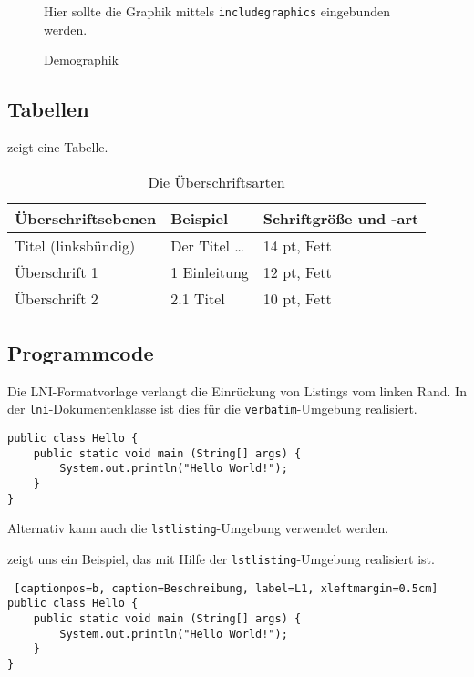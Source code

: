 \documentclass{lni}
\begin{document}
\begin{figure}
  \centering
  Hier sollte die Graphik mittels \texttt{includegraphics} eingebunden werden.

  \caption{Demographik}
  \label{fig:demo}
\end{figure}

\subsection{Tabellen}
 zeigt eine Tabelle.

\begin{table}
\centering
\begin{tabular}{lll}
\toprule
Überschriftsebenen & Beispiel & Schriftgröße und -art \\
\midrule
Titel (linksbündig) & Der Titel \ldots & 14 pt, Fett\\
Überschrift 1 & 1 Einleitung & 12 pt, Fett\\
Überschrift 2 & 2.1 Titel & 10 pt, Fett\\
\bottomrule
\end{tabular}
\caption{Die Überschriftsarten}
\label{tab:demo}
\end{table}

\subsection{Programmcode}
Die LNI-Formatvorlage verlangt die Einrückung von Listings vom linken Rand.
In der \texttt{lni}-Dokumentenklasse ist dies für die \texttt{verbatim}-Umgebung realisiert.

\begin{verbatim}
public class Hello { 
    public static void main (String[] args) { 
        System.out.println("Hello World!"); 
    } 
} 
\end{verbatim}

Alternativ kann auch die \texttt{lstlisting}-Umgebung verwendet werden.

 zeigt uns ein Beispiel, das mit Hilfe der \texttt{lstlisting}-Umgebung realisiert ist.

\lstset{basicstyle=\ttfamily}
\begin{lstlisting} [captionpos=b, caption=Beschreibung, label=L1, xleftmargin=0.5cm]
public class Hello { 
    public static void main (String[] args) { 
        System.out.println("Hello World!"); 
    } 
}
\end{lstlisting}
\end{document}
